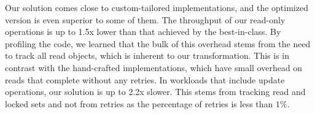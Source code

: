 
Our solution comes close to custom-tailored implementations, and the optimized version is even superior to some of them.
The throughput of our read-only operations is up to 1.5x lower than that achieved by the best-in-class.
By profiling the code, we learned that the bulk of this overhead stems from the need to track all read objects,
which is inherent to our transformation.
This is in contrast with the hand-crafted implementations, which have small overhead on reads that complete without any retries. 
In workloads that include update operations, our solution is up to 2.2x slower. This stems from tracking read and locked sets and not from retries as the percentage of retries is less than $1\%$. 





